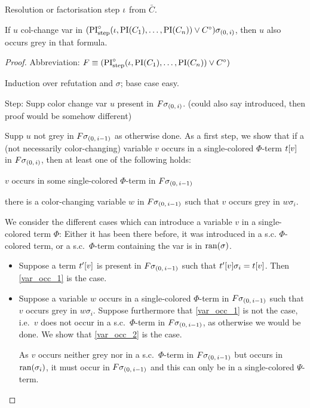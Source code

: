 \documentclass[,%
	draft=false,%
	numbers=noendperiod
	12pt,
	a4paper,
	oneside,%
	openany,
]{memoir}
\begin{document}
\begin{lemma}
	\label{lemma:col_change}
	Resolution or factorisation step $\iota$ from $\bar C$.

	If $u$ col-change var in $(\operatorname{PI}^\circ_{\mathrm{step}}(\iota, \operatorname{PI}(C_1), \dots, \operatorname{PI}(C_n)) \lor C^\circ)\sigma_{(0,\,i)}$, then $u$ also occurs grey in that formula.
\end{lemma}
\begin{proof}
	Abbreviation: $F \equiv (\operatorname{PI}^\circ_{\mathrm{step}}(\iota, \operatorname{PI}(C_1), \dots, \operatorname{PI}(C_n)) \lor C^\circ)$

	Induction over refutation and $\sigma$; base case easy.

Step:
Supp color change var $u$ present in 
$F\sigma_{(0,\,i)}$. (could also say introduced, then proof would be somehow different)

Supp $u$ not grey in 
$F\sigma_{(0,\,i-1)}$ as otherwise done.
As a first step, we show that if a (not necessarily color-changing) variable $v$ occurs in a single-colored $\Phi$-term $t[v]$ in $F\sigma_{(0,\,i)}$,
then at least one of the following holds:
\begin{compactenum}
\item $v$ occurs in some single-colored $\Phi$-term in $F\sigma_{(0,\,i-1)}$ \label{var_occ_1}
\item there is a color-changing variable $w$ in $F\sigma_{(0,\,i-1)}$ such that $v$ occurs grey in $w\sigma_i$.  \label{var_occ_2}
\end{compactenum}
We consider the different cases which can introduce a variable $v$ in a single-colored term $\Phi$: Either it has been there before, it was introduced in a s.c. $\Phi$-colored term, or a s.c.\ $\Phi$-term containing the var is in $\operatorname{ran}(\sigma)$.
\begin{itemize}
	\item
		Suppose a term $t'[v]$ is present in $F\sigma_{(0,\,i-1)}$ such that $t'[v]\sigma_i = t[v]$.
		Then \ref{var_occ_1} is the case.
	\item
		Suppose a variable $w$ occurs in a single-colored $\Phi$-term in $F\sigma_{(0,\,i-1)}$ such that $v$ occurs grey in $w\sigma_i$.
		Suppose furthermore that \ref{var_occ_1} is not the case, i.e.\ $v$ does not occur in a s.c.\ $\Phi$-term in $F\sigma_{(0,\,i-1)}$, as otherwise we would be done.
		We show that \ref{var_occ_2} is the case.

		As $v$ occurs neither grey nor in a s.c.\ $\Phi$-term in $F\sigma_{(0,\,i-1)}$ but occurs in $\operatorname{ran}(\sigma_i)$, it must occur in $F\sigma_{(0,\,i-1)}$ and this can only be in a single-colored $\Psi$-term.


\end{itemize}
\end{proof}
\end{document}
